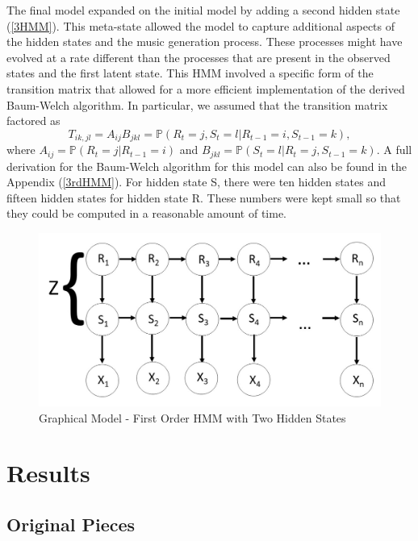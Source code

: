 \documentclass{article} %
\begin{document}
The final model expanded on the initial model by adding a second hidden state (\autoref{3HMM}). This meta-state allowed the model to capture additional aspects of the hidden states and the music generation process.  These processes might have evolved at a rate different than the processes that are present in the observed states and the first latent state.  This HMM involved a specific form of the transition matrix that allowed for a more efficient implementation of the derived Baum-Welch algorithm.  In particular, we assumed that the transition matrix factored as
$$T_{ik, jl} = A_{ij}B_{jkl} = \mathbb{P}(R_t = j, S_t = l | R_{t-1} = i, S_{t-1} = k),$$
where $A_{ij} = \mathbb{P}(R_t = j | R_{t-1} = i)$ and $B_{jkl} = \mathbb{P}(S_t = l | R_t = j, S_{t-1} = k)$.  A full derivation for the Baum-Welch algorithm for this model can also be found in the Appendix (\autoref{3rdHMM}). For hidden state S, there were ten hidden states and fifteen hidden states for hidden state R. These numbers were kept small so that they could be computed in a reasonable amount of time.

\begin{figure}[H]
\centering

\includegraphics [scale = 0.35] {Model3.jpg}
\caption{Graphical Model - First Order HMM with Two Hidden States\label{3HMM}}
\end{figure}


\section{Results}

\subsection{Original Pieces}
\end{document}
